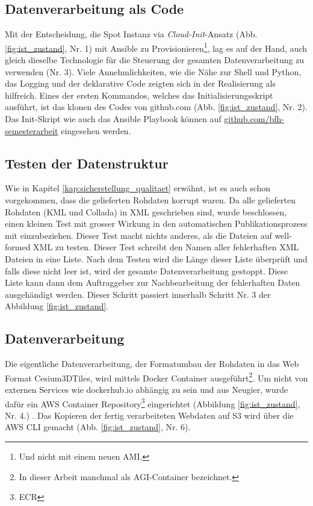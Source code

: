 \subsection{Datenverarbeitung als Code}
Mit der Entscheidung, die Spot Instanz via \emph{Cloud-Init}-Ansatz (Abb. \ref{fig:ist_zustand}, Nr. 1) mit Ansible zu Provisionieren\footnote{Und nicht mit einem neuen AMI.}, lag es auf der Hand, auch gleich dieselbe Technologie für die Steuerung der gesamten Datenverarbeitung zu verwenden (Nr. 3). 
Viele Annehmlichkeiten, wie die Nähe zur Shell und Python, das Logging und der deklarative Code zeigten sich in der Realisierung als hilfreich. Eines der ersten Kommandos, welches das Initialisierungsskript ausführt, ist das klonen des Codes von github.com (Abb. \ref{fig:ist_zustand}, Nr. 2). Das Init-Skript wie auch das Ansible Playbook können auf \href{https://github.com/bfh-semesterarbeit/up-and-running-dataprocessing}{github.com/bfh-semesterarbeit} eingesehen werden.


\subsection{Testen der Datenstruktur}
Wie in Kapitel \ref{kap:sicherstellung_qualitaet} erwähnt, ist es auch schon vorgekommen, dass die gelieferten Rohdaten korrupt waren. Da alle gelieferten Rohdaten (KML und Collada) in XML geschrieben sind, wurde beschlossen, einen kleinen Test mit grosser Wirkung in den automatischen Publikationsprozess mit einzubeziehen. Dieser Test macht nichts anderes, als die Dateien auf well-formed XML zu testen. 
Dieser Test schreibt den Namen aller fehlerhaften XML Dateien in eine Liste. Nach dem Testen wird die Länge dieser Liste überprüft und falls diese nicht leer ist, wird der gesamte Datenverarbeitung gestoppt. Diese Liste kann dann dem Auftraggeber zur Nachbearbeitung der fehlerhaften Daten ausgehändigt werden. Dieser Schritt passiert innerhalb Schritt Nr. 3 der  Abbildung \ref{fig:ist_zustand}.

\subsection{Datenverarbeitung}
Die eigentliche Datenverarbeitung, der Formatumbau der Rohdaten in das Web Format Cesium3DTiles, wird mittels Docker Container ausgeführt\footnote{In dieser Arbeit manchmal als AGI-Container bezeichnet.}. Um nicht von externen Services wie dockerhub.io abhängig zu sein und aus Neugier, wurde dafür ein AWS Container Repository\footnote{ECR} eingerichtet (Abbildung \ref{fig:ist_zustand}, Nr. 4.) \cite{9781484251003}. Das Kopieren der fertig verarbeiteten Webdaten auf S3 wird über die AWS CLI gemacht (Abb. \ref{fig:ist_zustand}, Nr. 6).

